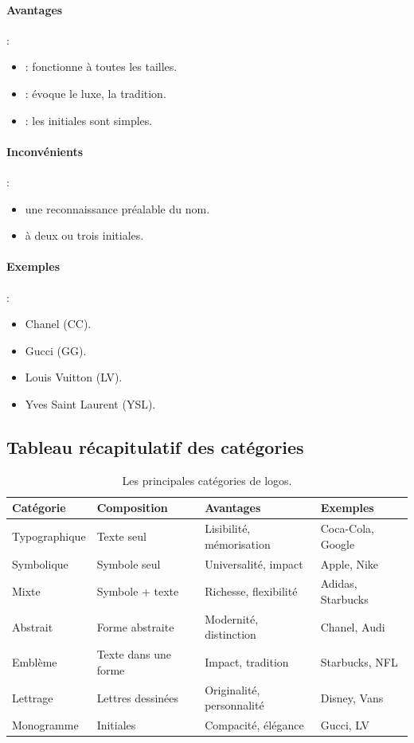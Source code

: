 \paragraph{Avantages} :
\begin{itemize}
    \item {} : fonctionne à toutes les tailles.
    \item {} : évoque le luxe, la tradition.
    \item {} : les initiales sont simples.
\end{itemize}

\paragraph{Inconvénients} :
\begin{itemize}
    \item {} une reconnaissance préalable du nom.
    \item {} à deux ou trois initiales.
\end{itemize}

\paragraph{Exemples} :
\begin{itemize}
    \item Chanel (CC).
    \item Gucci (GG).
    \item Louis Vuitton (LV).
    \item Yves Saint Laurent (YSL).
\end{itemize}

\subsection{Tableau récapitulatif des catégories}

\begin{table}[h!]
\centering
\begin{tabular}{@{}p{3cm}p{4cm}p{4cm}p{3cm}@{}}
\toprule
\textbf{Catégorie} & \textbf{Composition} & \textbf{Avantages} & \textbf{Exemples} \\
\midrule
Typographique & Texte seul & Lisibilité, mémorisation & Coca-Cola, Google \\
Symbolique & Symbole seul & Universalité, impact & Apple, Nike \\
Mixte & Symbole + texte & Richesse, flexibilité & Adidas, Starbucks \\
Abstrait & Forme abstraite & Modernité, distinction & Chanel, Audi \\
Emblème & Texte dans une forme & Impact, tradition & Starbucks, NFL \\
Lettrage & Lettres dessinées & Originalité, personnalité & Disney, Vans \\
Monogramme & Initiales & Compacité, élégance & Gucci, LV \\
\bottomrule
\end{tabular}
\caption{Les principales catégories de logos.}
\end{table}


